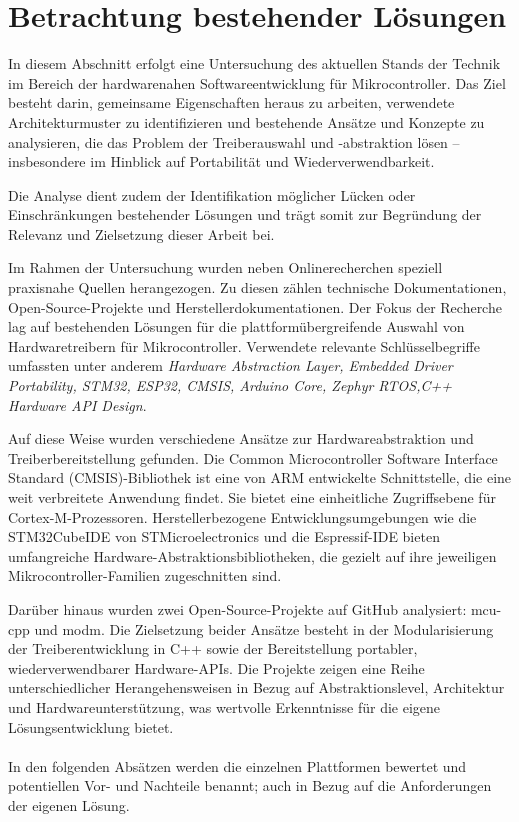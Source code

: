 \section{Betrachtung bestehender Lösungen}
In diesem Abschnitt erfolgt eine Untersuchung des aktuellen Stands der Technik im Bereich der hardwarenahen Softwareentwicklung für Mikrocontroller.
Das Ziel besteht darin, gemeinsame Eigenschaften heraus zu arbeiten, verwendete Architekturmuster zu identifizieren und bestehende Ansätze und Konzepte zu analysieren, die das Problem der Treiberauswahl und -abstraktion lösen – insbesondere im Hinblick auf Portabilität und Wiederverwendbarkeit. 

Die Analyse dient zudem der Identifikation möglicher Lücken oder Einschränkungen bestehender Lösungen und trägt somit zur Begründung der Relevanz und Zielsetzung dieser Arbeit bei.

Im Rahmen der Untersuchung wurden neben Onlinerecherchen speziell praxisnahe Quellen herangezogen. 
Zu diesen zählen technische Dokumentationen, Open-Source-Projekte und Herstellerdokumentationen.
Der Fokus der Recherche lag auf bestehenden Lösungen für die plattformübergreifende Auswahl von Hardwaretreibern für Mikrocontroller.
Verwendete relevante Schlüsselbegriffe umfassten unter anderem \textit{Hardware Abstraction Layer, Embedded Driver Portability, STM32, ESP32, CMSIS, Arduino Core, Zephyr RTOS,C++ Hardware API Design}.

Auf diese Weise wurden verschiedene Ansätze zur Hardwareabstraktion und Treiberbereitstellung gefunden.
Die Common Microcontroller Software Interface Standard (CMSIS)-Bibliothek ist eine von ARM entwickelte Schnittstelle, die eine weit verbreitete Anwendung findet. 
Sie bietet eine einheitliche Zugriffsebene für Cortex-M-Prozessoren. 
Herstellerbezogene Entwicklungsumgebungen wie die STM32CubeIDE von STMicroelectronics und die Espressif-IDE bieten umfangreiche Hardware-Abstraktionsbibliotheken, die gezielt auf ihre jeweiligen Mikrocontroller-Familien zugeschnitten sind.

Darüber hinaus wurden zwei Open-Source-Projekte auf GitHub analysiert: mcu-cpp und modm. 
Die Zielsetzung beider Ansätze besteht in der Modularisierung der Treiberentwicklung in C++ sowie der Bereitstellung portabler, wiederverwendbarer Hardware-APIs. 
Die Projekte zeigen eine Reihe unterschiedlicher Herangehensweisen in Bezug auf Abstraktionslevel, Architektur und Hardwareunterstützung, was wertvolle Erkenntnisse für die eigene Lösungsentwicklung bietet.
\\
\\
In den folgenden Absätzen werden die einzelnen Plattformen bewertet und potentiellen Vor- und Nachteile benannt; auch in Bezug auf die Anforderungen der eigenen Lösung. 


